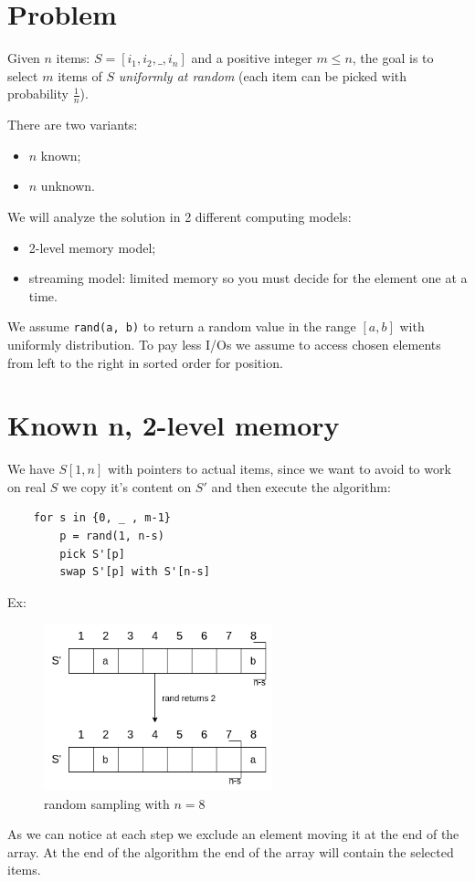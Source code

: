\section{Problem}
Given $n$ items: $S=[i_1, i_2, \_, i_n]$ and a positive integer $m \leq n$, the goal is to select $m$ items of $S$ \emph{uniformly at random} (each item can be picked with probability $\frac{1}{n}$).

There are two variants:
\begin{itemize}
    \item $n$ known;
    \item $n$ unknown.
\end{itemize}

We will analyze the solution in 2 different computing models:
\begin{itemize}
    \item 2-level memory model;
    \item streaming model: limited memory so you must decide for the element one at a time.
\end{itemize}

We assume \verb|rand(a, b)| to return a random value in the range $[a, b]$ with uniformly distribution.
To pay less I/Os we assume to access chosen elements from left to the right in sorted order for position.

\section{Known n, 2-level memory}
We have $S[1, n]$ with pointers to actual items, since we want to avoid to work on real $S$ we copy it's content on $S'$ and then execute the algorithm:
\begin{verbatim}
    for s in {0, _ , m-1}
        p = rand(1, n-s)
        pick S'[p]
        swap S'[p] with S'[n-s]
\end{verbatim}
Ex:
\begin{figure}[H]
    \centering
    \includegraphics[width=250px]{images/3_Random_Sampling/random_sampling_1.png}
    \caption{random sampling with $n = 8$}
\end{figure}
As we can notice at each step we exclude an element moving it at the end of the array.
At the end of the algorithm the end of the array will contain the selected items.


